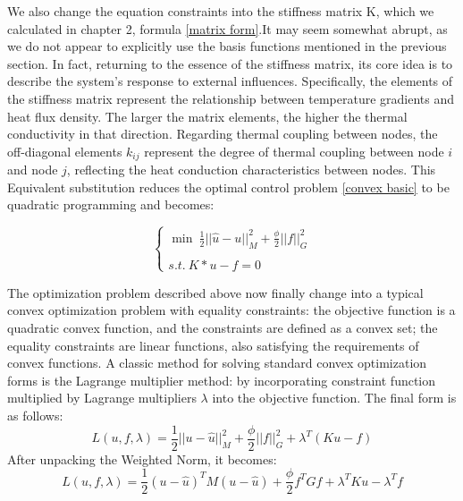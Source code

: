 \documentclass{article}
\begin{document}
We also change the equation constraints into the stiffness matrix K, which we calculated in chapter 2, formula \ref{matrix form}.It may seem somewhat abrupt, as we do not appear to explicitly use the basis functions mentioned in the previous section. In fact, returning to the essence of the stiffness matrix, its core idea is to describe the system's response to external influences. Specifically, the elements of the stiffness matrix represent the relationship between temperature gradients and heat flux density. The larger the matrix elements, the higher the thermal conductivity in that direction. Regarding thermal coupling between nodes, the off-diagonal elements \(k_{ij}\) represent the degree of thermal coupling between node \(i\) and node \(j\), reflecting the heat conduction characteristics between nodes.
This Equivalent substitution reduces the optimal control problem \ref{convex basic} to be quadratic programming and becomes:

\begin{equation}
\begin{cases}
    \min \:\frac{1}{2}||\hat{u}-u||^2_{M}+\frac{\phi}{2}||f||^2_{G}\\
    \\
    s.t. \:K*u - f = 0  
\end{cases}
\end{equation}


The optimization problem described above now finally change into a typical convex optimization problem with equality constraints: the objective function is a quadratic convex function, and the constraints are defined as a convex set; the equality constraints are linear functions, also satisfying the requirements of convex functions. A classic method for solving standard convex optimization forms is the Lagrange multiplier method: by incorporating  constraint function multiplied by Lagrange multipliers $\lambda$ into the objective function. The final form is as follows:
\begin{equation}
     L(u,f,\lambda) = \frac{1}{2}||u-\hat{u}||^2_M+\frac{\phi}{2}||f||^2_{G}+\lambda^T(Ku-f)
\end{equation}
After unpacking the Weighted Norm, it becomes:
\begin{equation}
    L(u,f,\lambda) = \frac{1}{2}(u-\hat{u})^T M (u-\hat{u})+\frac{\phi}{2}f^TGf+\lambda^TKu-\lambda^Tf
\end{equation}
\end{document}
